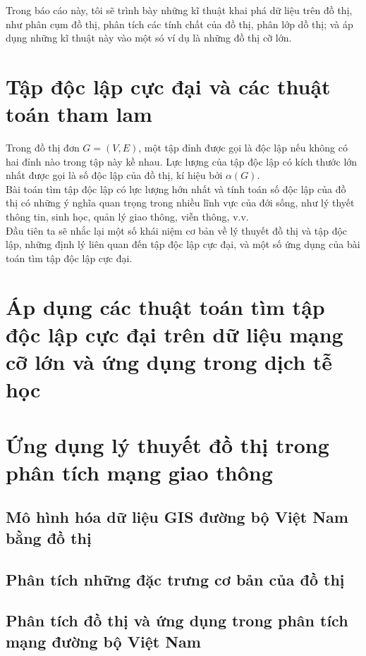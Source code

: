 \documentclass[13pt, oneside, a4paper, openany]{article}
\begin{document}
\begin{Large}
Trong báo cáo này, tôi sẽ trình bày những kĩ thuật khai phá dữ liệu trên đồ thị, như phân cụm đồ thị, phân tích các tính chất của đồ thị, phân lớp dồ thị; và áp dụng những kĩ thuật này vào một só ví dụ là những đồ thị cỡ lớn.
\section{Tập độc lập cực đại và các thuật toán tham lam}
Trong đồ thị đơn $G = (V,E)$, một tập đỉnh được gọi là độc lập nếu không có hai đỉnh nào trong tập này kề nhau. Lực lượng của tập độc lập có kích thước lớn nhất được gọi là số độc lập của đồ thị, kí hiệu bởi $\alpha(G)$.\\
Bài toán tìm tập độc lập có lực lượng hớn nhất và tính toán số độc lập của đồ thị có những ý nghĩa quan trọng trong nhiều lĩnh vực của đới sống, như lý thyết thông tin, sinh học, quản lý giao thông, viễn thông, v.v.\\
Đầu tiên ta sẽ nhắc lại một số khái niệm cơ bản về lý thuyết đồ thị và tập độc lập, những định lý liên quan đến tập độc lập cực đại, và một số ứng dụng của bài toán tìm tập độc lập cực đại.\\


\section{Áp dụng các thuật toán tìm tập độc lập cực đại trên dữ liệu mạng cỡ lớn và ứng dụng trong dịch tễ học}
\section{Ứng dụng lý thuyết đồ thị trong phân tích mạng giao thông}
\subsection{Mô hình hóa dữ liệu GIS đường bộ Việt Nam bằng đồ thị}
\subsection{Phân tích những đặc trưng cơ bản của đồ thị}
\subsection{Phân tích đồ thị và ứng dụng trong phân tích mạng đường bộ Việt Nam}

\end{Large}
\end{document}
